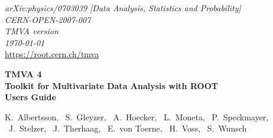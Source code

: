 \vspace{-1cm}
\begin{flushright}
{\sf\em arXiv:physics/0703039 [Data Analysis, Statistics and Probability]} \\
{\sf\em CERN-OPEN-2007-007} \\
{\sf\em TMVA version \TMVAVersion} \\
{\sf\em \today} \\
\def\UrlFont{\sf\em}
\url{https://root.cern.ch/tmva} 
\end{flushright}
\def\UrlFont{\rm}

\def\miniPageOffset{0.2cm}
\def\miniPageWidth{13.5cm}
\HRule
\begin{flushleft}
\hspace{\miniPageOffset}\begin{minipage}{\miniPageWidth}
{\sf\Huge\bfseries\boldmath TMVA 4} \\[0.2cm]
{\sf\Large\bfseries\boldmath Toolkit for Multivariate Data Analysis with ROOT} \\[1cm]
{\sf\Huge\bfseries\boldmath Users Guide} 
\end{minipage}
\end{flushleft}
\HRule
\vspace{2.0cm}
\begin{flushright}
{\sf\Large
   K.~Albertsson,
   ~S.~Gleyzer,
   ~A.~Hoecker,
   ~L.~Moneta,
   ~P.~Speckmayer,\\
   ~J.~Stelzer,
   ~J.~Therhaag,
   ~E.~von Toerne,
   ~H.~Voss,
   ~S.~Wunsch
}

\vspace{1.2cm}

\end{flushright}


